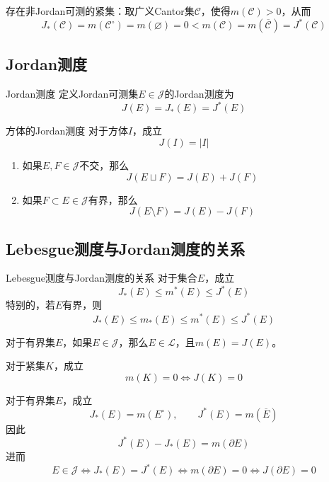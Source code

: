 \documentclass[lang = cn, scheme = chinese, thmcnt = section]{elegantbook}
\newcommand{\sub}{\subset}             %
\begin{document}
\begin{note}
	存在非Jordan可测的紧集：取广义Cantor集$\mathcal{C}$，使得$m(\mathcal{C})>0$，从而%
	$$
	J_*(\mathcal{C})
	=m(\mathcal{C}^\circ)
	=m(\varnothing)
	=0<m(\mathcal{C})
	=m(\overline{\mathcal{C}})
	=J^*(\mathcal{C})
	$$
\end{note}

\subsection{Jordan测度}

\begin{definition}{Jordan测度}
	定义Jordan可测集$E\in \mathscr{J}$的Jordan测度为
	$$
	J(E)=J_*(E)=J^*(E)
	$$
\end{definition}

\begin{theorem}{方体的Jordan测度}
	对于方体$I$，成立
	$$
	J(I)=|I|
	$$
\end{theorem}

\begin{theorem}
	\begin{enumerate}
		\item 如果$E,F\in\mathscr{J}$不交，那么
		$$
		J(E\sqcup F)=J(E)+J(F)
		$$
		\item 如果$F\sub E\in \mathscr{J}$有界，那么
		$$
		J(E\setminus F)=J(E)-J(F)
		$$
	\end{enumerate}
\end{theorem}

\subsection{Lebesgue测度与Jordan测度的关系}

\begin{theorem}{Lebesgue测度与Jordan测度的关系}
	对于集合$E$，成立
	$$
	J_*(E)\le m^*(E)\le J^*(E)
	$$
	特别的，若$E$有界，则
	$$
	J_*(E)\le m_*(E)\le m^*(E)\le J^*(E)
	$$
\end{theorem}

\begin{corollary}
	对于有界集$E$，如果$E\in\mathscr{J}$，那么$E\in \mathscr{L}$，且$m(E)=J(E)$。
\end{corollary}

\begin{theorem}
	对于紧集$K$，成立
	$$
	m(K)=0\iff J(K)=0
	$$
\end{theorem}

\begin{theorem}
	对于有界集$E$，成立%
	$$
	J_*(E)=m(E^\circ),\qquad 
	J^*(E)=m(\overline{E})
	$$
	因此
	$$
	J^*(E)-J_*(E)=m(\partial E)
	$$
	进而
	$$
	E\in\mathscr{J}
	\iff J_*(E)=J^*(E)
	\iff m(\partial E)=0
	\iff J(\partial E)=0
	$$
\end{theorem}
\end{document}
